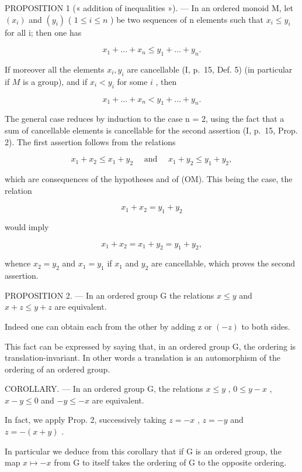 PROPOSITION 1 (« addition of inequalities »). --- In an ordered monoid M, let \((x_{i})\) and \((y_{i})\) ( \(1 \leqslant i \leqslant n\) ) be two sequences of n elements such that \(x_{i} \leqslant y_{i}\) for all i; then one has

\[
x _ {1} + \dots + x _ {n} \leqslant y _ {1} + \dots + y _ {n}.
\]

If moreover all the elements \(x_{i}, y_{i}\) are cancellable (I, p.~15, Def. 5) (in particular if \(M\) is a group), and if \(x_{i} < y_{i}\) for some \(i\) , then

\[
x _ {1} + \dots + x _ {n} <   y _ {1} + \dots + y _ {n}.
\]

The general case reduces by induction to the case n = 2, using the fact that a sum of cancellable elements is cancellable for the second assertion (I, p.~15, Prop. 2). The first assertion follows from the relations

\[
x _ {1} + x _ {2} \leqslant x _ {1} + y _ {2} \quad \text { and } \quad x _ {1} + y _ {2} \leqslant y _ {1} + y _ {2},
\]

which are consequences of the hypotheses and of (OM). This being the case, the relation

\[
x _ {1} + x _ {2} = y _ {1} + y _ {2}
\]

would imply

\[
x _ {1} + x _ {2} = x _ {1} + y _ {2} = y _ {1} + y _ {2},
\]

whence \(x_{2} = y_{2}\) and \(x_{1} = y_{1}\) if \(x_{1}\) and \(y_{2}\) are cancellable, which proves the second assertion.

PROPOSITION 2. --- In an ordered group G the relations \(x \leqslant y\) and \(x + z \leqslant y + z\) are equivalent.

Indeed one can obtain each from the other by adding z or \((-z)\) to both sides.

This fact can be expressed by saying that, in an ordered group G, the ordering is translation-invariant. In other words a translation is an automorphism of the ordering of an ordered group.

COROLLARY. --- In an ordered group G, the relations \(x \leqslant y\) , \(0 \leqslant y - x\) , \(x - y \leqslant 0\) and \(-y \leqslant -x\) are equivalent.

In fact, we apply Prop. 2, successively taking \(z = -x\) , \(z = -y\) and \(z = - (x + y)\) .

In particular we deduce from this corollary that if G is an ordered group, the map \(x \mapsto -x\) from G to itself takes the ordering of G to the opposite ordering.

